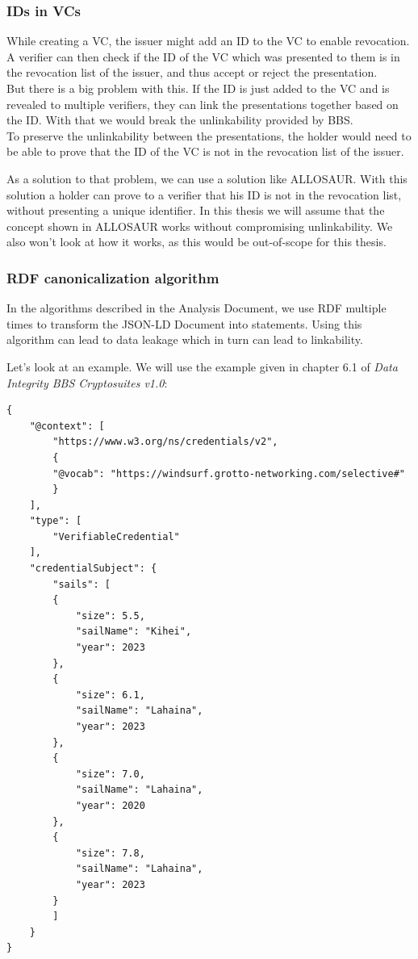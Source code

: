 \documentclass[
	a4paper               %
	,bibliography=totoc   %
	,listof=totoc         %
	,monolingual
	twoside=false,
]{bfhthesis}              %
\begin{document}
\subsubsection{IDs in VCs}
While creating a VC, the issuer might add an ID to the VC to enable revocation.
A verifier can then check if the ID of the VC which was presented to them is in the revocation list of the issuer, and thus accept or reject the presentation.\\
But there is a big problem with this.
If the ID is just added to the VC and is revealed to multiple verifiers, they can link the presentations together based on the ID.
With that we would break the unlinkability provided by BBS.\\

To preserve the unlinkability between the presentations, the holder would need to be able to prove that the ID of the VC is not in the revocation list of the issuer.

As a solution to that problem, we can use a solution like ALLOSAUR\cite{allosaur}. 
With this solution a holder can prove to a verifier that his ID is not in the revocation list, without presenting a unique identifier.
In this thesis we will assume that the concept shown in ALLOSAUR works without compromising unlinkability.
We also won't look at how it works, as this would be out-of-scope for this thesis.

\subsubsection{RDF canonicalization algorithm}
In the algorithms described in the Analysis Document, we use RDF multiple times to transform the JSON-LD Document into statements.
Using this algorithm can lead to data leakage which in turn can lead to linkability.

Let's look at an example.
We will use the example given in chapter 6.1 of \textit{Data Integrity BBS Cryptosuites v1.0}\cite{bbsvc}:

\begin{lstlisting}[language=canon,firstnumber=1,caption={Example: Sails VC},captionpos=b]
{
	"@context": [
		"https://www.w3.org/ns/credentials/v2",
		{
		"@vocab": "https://windsurf.grotto-networking.com/selective#"
		}
	],
	"type": [
		"VerifiableCredential"
	],
	"credentialSubject": {
		"sails": [
		{
			"size": 5.5,
			"sailName": "Kihei",
			"year": 2023
		},
		{
			"size": 6.1,
			"sailName": "Lahaina",
			"year": 2023
		},
		{
			"size": 7.0,
			"sailName": "Lahaina",
			"year": 2020
		},
		{
			"size": 7.8,
			"sailName": "Lahaina",
			"year": 2023
		}
		]
	}
}
\end{lstlisting}
\end{document}
